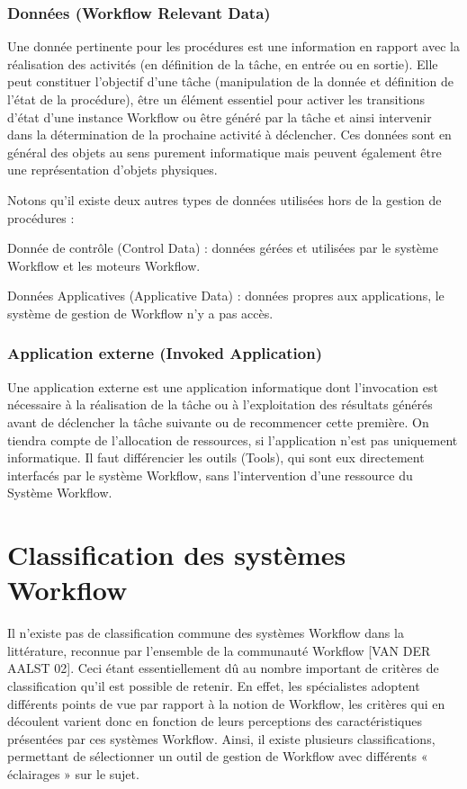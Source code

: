  	 	 \subsubsection{Données (Workflow Relevant Data) }
 	 
 	 Une donnée pertinente pour les procédures est une information en rapport avec la réalisation des activités (en définition de la tâche, en entrée ou en sortie). Elle peut constituer l’objectif d’une tâche (manipulation de la donnée et définition de l’état de la procédure), être un élément essentiel pour activer les transitions d’état d’une instance Workflow ou être généré par la tâche et ainsi intervenir dans la détermination de la prochaine activité à déclencher. Ces données sont en général des objets au sens purement informatique mais peuvent également être une représentation d’objets physiques. 
 	 
 	 Notons qu’il existe deux autres types de données utilisées hors de la gestion de procédures : 
 	 
 	 Donnée de contrôle (Control Data) : données gérées et utilisées par le système Workflow et les moteurs Workflow.
 	 
 	 Données Applicatives (Applicative Data) : données propres aux applications, le système de gestion de Workflow n’y a pas accès. 
 	 
 	 \subsubsection{ Application externe (Invoked Application) }
 	 Une application externe est une application informatique dont l’invocation est nécessaire à la réalisation de la tâche ou à l’exploitation des résultats générés avant de déclencher la tâche suivante ou de recommencer cette première. On tiendra compte de l’allocation de ressources, si l’application n’est pas uniquement informatique. Il faut différencier les outils (Tools), qui sont eux directement interfacés par le système Workflow, sans l’intervention d’une ressource du Système Workflow.
 	 
 	 
 	 
 	 
 	 
 	 
 	 

\section{Classification des systèmes Workflow}

Il n’existe pas de classification commune des systèmes Workflow dans la littérature, reconnue par l’ensemble de la communauté Workflow [VAN DER AALST 02]. Ceci étant essentiellement dû au nombre important de critères de classification qu’il est possible de retenir.
En effet, les spécialistes adoptent différents points de vue par rapport à la notion de Workflow, les critères qui en découlent varient donc en fonction de leurs perceptions des caractéristiques présentées par ces systèmes Workflow. Ainsi, il existe plusieurs classifications, permettant de sélectionner un outil de gestion de Workflow avec différents « éclairages » sur le sujet.

